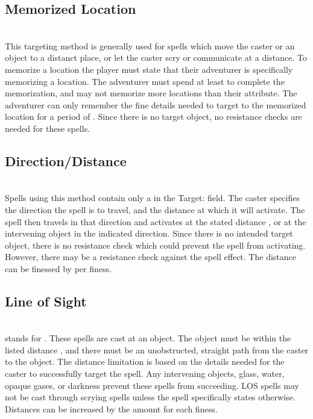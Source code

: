 \begin{multicols*}{2}
\subsection{Memorized Location}
\\
This targeting method is generally used for spells which move the caster or an object to a distanct place, or let the caster scry or communicate at a distance. To memorize a location the player must state that their adventurer is specifically memorizing a location. The adventurer must spend at least  to complete the memorization, and may not memorize more locations than their \INT attribute. The adventurer can only remember the fine details needed to target to the memorized location for a period of . Since there is no target object, no resistance checks are needed for these spells.
\subsection{Direction/Distance}
\\
Spells using this method contain only a  in the Target: field. The caster specifies the direction the spell is to travel, and the distance at which it will activate. The spell then travels in that direction and activates at the stated distance , or at the  intervening object in the indicated direction. Since there is no intended target object, there is no resistance check which could prevent the spell from activating. However, there may be a resistance check against the spell effect. The distance can be finessed by  per finess.
\subsection{Line of Sight}
\\
\LOS stands for . These spells are cast at an object. The object must be within the listed distance , and there must be an unobstructed, straight path from the caster to the object. The distance limitation is based on the details needed for the caster to successfully target the spell. Any intervening objects, glass, water, opaque gases, or darkness prevent these spells from succeeding. LOS spells may not be cast through scrying spells unless the spell specifically states otherwise. Distances can be increased by the amount  for each finess.


\end{multicols*}
